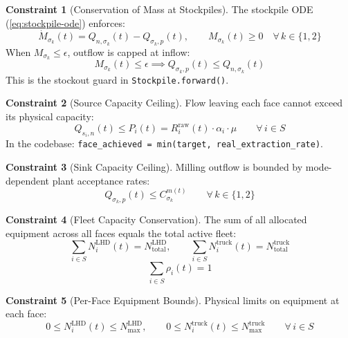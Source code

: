 \documentclass[11pt,a4paper]{article}
\theoremstyle{definition}
\newtheorem{constraint}{Constraint}[section]
\begin{document}
\begin{constraint}[Conservation of Mass at Stockpiles]
\label{con:mass-stockpile}
The stockpile ODE (\cref{eq:stockpile-ode}) enforces:
\begin{equation}
  \dot{M}_{\sigma_k}(t) = Q_{n,\sigma_k}(t) - Q_{\sigma_k,p}(t), \qquad
  M_{\sigma_k}(t) \geq 0 \quad \forall\, k \in \{1,2\}
\end{equation}
When $M_{\sigma_k} \leq \epsilon$, outflow is capped at inflow:
\begin{equation}
  M_{\sigma_k}(t) \leq \epsilon \implies Q_{\sigma_k,p}(t) \leq Q_{n,\sigma_k}(t)
\end{equation}
This is the stockout guard in \texttt{Stockpile.forward()}.
\end{constraint}

\begin{constraint}[Source Capacity Ceiling]
\label{con:source-ceiling}
Flow leaving each face cannot exceed its physical capacity:
\begin{equation}
  Q_{s_i,n}(t) \leq P_i(t) = R_i^{\text{raw}}(t) \cdot \alpha_i \cdot \mu
  \qquad \forall\, i \in S
\end{equation}
In the codebase: \texttt{face\_achieved = min(target, real\_extraction\_rate)}.
\end{constraint}

\begin{constraint}[Sink Capacity Ceiling]
\label{con:sink-ceiling}
Milling outflow is bounded by mode-dependent plant acceptance rates:
\begin{equation}
  Q_{\sigma_k,p}(t) \leq C_{\sigma_k}^{m(t)} \qquad \forall\, k \in \{1,2\}
\end{equation}
\end{constraint}

\begin{constraint}[Fleet Capacity Conservation]
\label{con:fleet}
The sum of all allocated equipment across all faces equals the total active fleet:
\begin{equation}
  \sum_{i \in S} N_i^{\text{LHD}}(t) = N^{\text{LHD}}_{\text{total}}, \qquad
  \sum_{i \in S} N_i^{\text{truck}}(t) = N^{\text{truck}}_{\text{total}}
\end{equation}
\begin{equation}
  \sum_{i \in S} \rho_i(t) = 1
\end{equation}
\end{constraint}

\begin{constraint}[Per-Face Equipment Bounds]
\label{con:equipment-bounds}
Physical limits on equipment at each face:
\begin{equation}
  0 \leq N_i^{\text{LHD}}(t) \leq N^{\text{LHD}}_{\max}, \qquad
  0 \leq N_i^{\text{truck}}(t) \leq N^{\text{truck}}_{\max}
  \qquad \forall\, i \in S
\end{equation}
\end{constraint}
\end{document}
